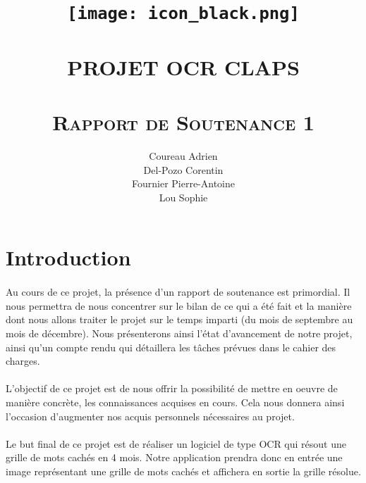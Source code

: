 \documentclass{article}
\begin{document}
\title{ \HUGE \textbf{ \texttt{[image: icon\_black.png]}}
		\\ [2.0cm]
		\Xhline{2pt} \\
        [0.5cm]
		\LARGE \uppercase{Projet OCR CLAPS}\\
        [0.5cm]
		\Xhline{2pt} \\ 
        [4cm]
		\textsc{Rapport de Soutenance 1}}
  
\author{
    Coureau Adrien\\
    Del-Pozo Corentin\\
    Fournier Pierre-Antoine\\
    Lou Sophie\\
}
\date{}
\maketitle
\newpage
\large
\pagestyle{fancy}
\cfoot{\thepage}
\tableofcontents
\pagebreak

\lhead{}

\renewcommand{\headrulewidth}{1pt}
\renewcommand{\footrulewidth}{1pt}
\section{Introduction}
\paragraph{}
Au cours de ce projet, la présence d’un rapport de soutenance est primordial. Il nous  permettra de nous concentrer sur le bilan de ce qui a été fait et la manière dont nous allons traiter le projet sur le temps imparti (du mois de septembre au mois de décembre).
Nous présenterons ainsi l’état d’avancement de notre projet, ainsi qu’un compte rendu qui détaillera les tâches prévues dans le cahier des charges.
\paragraph{}
L’objectif de ce projet est de nous offrir la possibilité de mettre en oeuvre de manière concrète, les connaissances acquises en cours. Cela nous donnera ainsi l’occasion d’augmenter nos acquis personnels nécessaires au projet.
\paragraph{}
Le but final de ce projet est de réaliser un logiciel de type OCR qui résout une grille de mots cachés en 4 mois. Notre application prendra donc en entrée une image représentant une grille de mots cachés et affichera en sortie la grille résolue.
\end{document}
